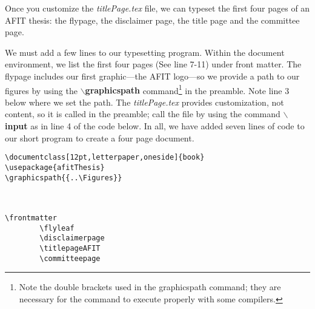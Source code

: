 Once you customize the {\em titlePage.tex} file, we can typeset
the first four pages of an AFIT thesis: the flypage, the disclaimer
page, the title page and the committee page. 

We must add a few lines to our typesetting program.  Within the
document environment, we list the first four pages (See line 7-11)
under front matter.  The flypage includes our first graphic---the AFIT
logo---so we provide a path to our figures by using the {\bf
$\backslash$graphicspath} command\footnote{Note the double brackets
used in the graphicspath command; they are necessary for the command
to execute properly with some compilers.} in the preamble.  Note line
3 below where we set the path.  The {\em titlePage.tex} provides
customization, not content, so it is called in the preamble;
call the file by using the command {\bf $\backslash$input} as in line
4 of the code below.  In all, we have added seven lines of code to our
short program to create a four page document.

\vspace{-0.25in}
{\singlespace
\begin{verbatim}
\documentclass[12pt,letterpaper,oneside]{book}
\usepackage{afitThesis}
\graphicspath{{..\Figures}}



\frontmatter
        \flyleaf                        
        \disclaimerpage                 
        \titlepageAFIT                      
        \committeepage  	

\end{verbatim}
}

